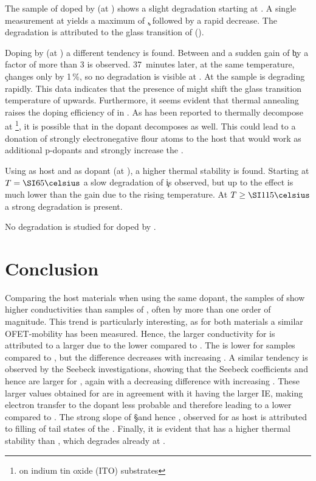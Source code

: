 The sample of \meo doped by \FS (at \C[0.040]) shows a slight degradation starting at \T[65]. A single measurement at \T[80] yields a maximum of \c, followed by a rapid decrease. The degradation is attributed to the glass transition of \meo (\Tg[67]\cite{Thelakkat1998}).

Doping \meo by \CSF (at \C[0.023]) a different tendency is found.
Between \T[70] and  a sudden gain of \c by a factor of more than 3 is observed. 37~minutes later, at the same temperature, \c changes only by 1\,\%, so no degradation is visible at \T[80]. At \T[90] the sample is degrading rapidly.
This data indicates that the presence of \CSF might shift the glass transition temperature of \meo upwards. Furthermore, it seems evident that thermal annealing raises the doping efficiency of \CSF in \meo.
As \CSF has been reported\cite{Mao2013} to thermally decompose at \T[120]\footnote{on indium tin oxide (ITO) substrates}, it is possible that in \meo the dopant decomposes as well. This could lead to a donation of strongly electronegative flour atoms to the host that would work as additional p-dopants and strongly increase the \nhLong.

Using \lili as host and \FS as dopant (at \C[0.100]), a higher thermal stability is found. Starting at $\T[65]$ a slow degradation of \c is observed, but up to \T[100] the effect is much lower than the gain due to the rising temperature. At $\T{}\geq\grad{115}$ a strong degradation is present.

No degradation is studied for \lili doped by \CSF.

\pagebreak
\section{Conclusion} \label{sec:ResP-Conclusion}
Comparing the host materials when using the same dopant, the samples of \meo show higher conductivities than samples of \lili, often by more than one order of magnitude. This trend is particularly interesting, as for both materials a similar OFET-mobility has been measured. Hence, the larger conductivity for \meo is attributed to a larger \nhLong due to the lower \IE compared to \lili.
The \EactLong is lower for \meo samples compared to \lili, but the difference decreases with increasing \CLong. A similar tendency is observed by the Seebeck investigations, showing that the Seebeck coefficients and hence \Es are larger for \lili, again with a decreasing difference with increasing \CLong.
These larger values obtained for \lili are in agreement with it having the larger IE, making electron transfer to the dopant less probable and therefore leading to a lower \nhLong compared to \meo. The strong slope of \S and hence \Es, observed for \lili as host is attributed to filling of tail states of the \dosLong.
Finally, it is evident that \lili has a higher thermal stability than \meo, which degrades already at \T[80].

